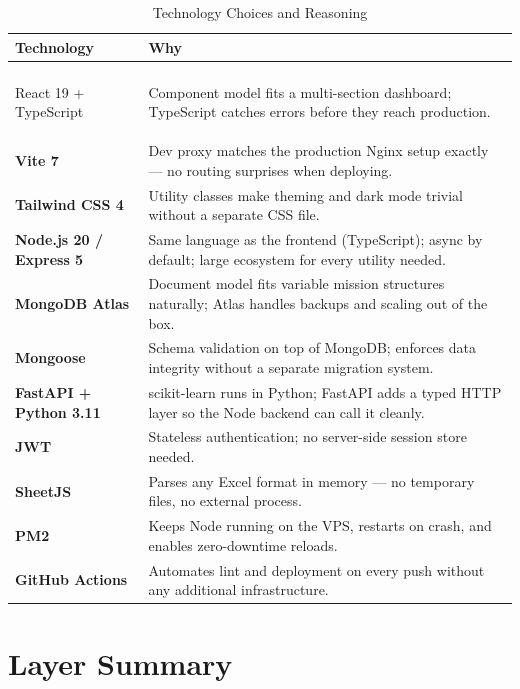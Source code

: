 \documentclass[12pt,a4paper]{report}
\begin{document}
\begin{longtable}{>{\bfseries}p{3.5cm} p{10cm}}
  \caption{Technology Choices and Reasoning}\label{tab:rationale}\\
  \toprule \textbf{Technology} & \textbf{Why}\\\midrule\endhead
  \midrule\multicolumn{2}{r}{\small\itshape Continued\ldots}\\\endfoot
  \bottomrule\endlastfoot

  React 19 + TypeScript  & Component model fits a multi-section dashboard; TypeScript catches errors before they reach production.\\[4pt]
  Vite 7                 & Dev proxy matches the production Nginx setup exactly --- no routing surprises when deploying.\\[4pt]
  Tailwind CSS 4         & Utility classes make theming and dark mode trivial without a separate CSS file.\\[4pt]
  Node.js 20 / Express 5 & Same language as the frontend (TypeScript); async by default; large ecosystem for every utility needed.\\[4pt]
  MongoDB Atlas          & Document model fits variable mission structures naturally; Atlas handles backups and scaling out of the box.\\[4pt]
  Mongoose               & Schema validation on top of MongoDB; enforces data integrity without a separate migration system.\\[4pt]
  FastAPI + Python 3.11  & scikit-learn runs in Python; FastAPI adds a typed HTTP layer so the Node backend can call it cleanly.\\[4pt]
  JWT                    & Stateless authentication; no server-side session store needed.\\[4pt]
  SheetJS                & Parses any Excel format in memory --- no temporary files, no external process.\\[4pt]
  PM2                    & Keeps Node running on the VPS, restarts on crash, and enables zero-downtime reloads.\\[4pt]
  GitHub Actions         & Automates lint and deployment on every push without any additional infrastructure.\\
\end{longtable}

\section{Layer Summary}
\end{document}

